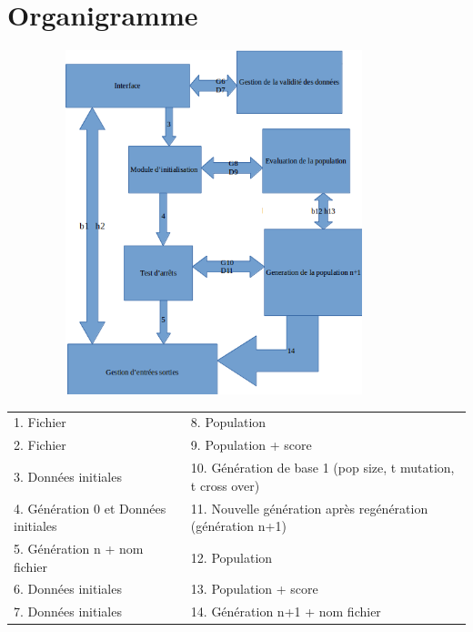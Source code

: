 \documentclass[a4paper,11pt]{article}
\begin{document}
	\section{Organigramme}
		\centerline{\includegraphics[width = 12cm,height = 10cm]{OrganigrammeV2.png}}
		\begin{center}
			\begin{tabular}{|l l|}
				\hline
				1. Fichier & 8. Population\\
				2. Fichier & 9. Population + score\\
				3. Données initiales & 10. Génération de base 1 (pop size, t mutation, t cross over)\\
				4. Génération 0 et Données initiales & 11. Nouvelle génération après regénération (génération n+1)\\
				5. Génération n + nom fichier & 12. Population\\
				6. Données initiales & 13. Population + score\\
				7. Données initiales & 14. Génération n+1 + nom fichier\\
				\hline 	
			\end{tabular}
		\end{center}
		
\end{document}
